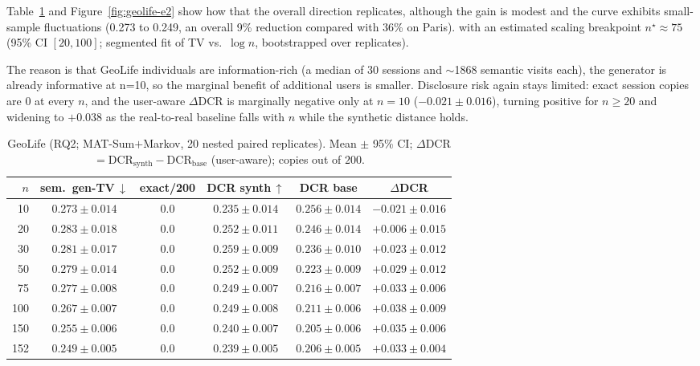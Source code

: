 \documentclass[sigconf,nonacm]{acmart}
\begin{document}
Table~\ref{tab:geolife-e2} and Figure~\ref{fig:geolife-e2} show  how that the overall direction replicates, although the gain is modest and the curve exhibits small-sample fluctuations (0.273 to 0.249, an overall 9\% reduction compared with 36\% on Paris).
 with an estimated scaling breakpoint $n^\star\!\approx\!75$ (95\% CI
$[20,100]$; segmented fit of TV vs.\ $\log n$, bootstrapped over replicates). 

The reason is that GeoLife
individuals are information-rich (a median of $30$ sessions and $\sim$1868 semantic visits each), the generator is already informative at n=10, so the marginal benefit of additional users is smaller. Disclosure risk again stays limited: exact session copies are $0$ at every $n$, and the user-aware $\Delta$DCR is marginally negative only at $n{=}10$
($-0.021\pm0.016$), turning positive for $n\ge20$ and widening to $+0.038$ as the real-to-real baseline
falls with $n$ while the synthetic distance holds.

\begin{table}[t]
  \caption{GeoLife (RQ2; MAT-Sum$+$Markov, 20 nested paired replicates). Mean $\pm$ 95\% CI;
  $\Delta$DCR $=\mathrm{DCR}_{\text{synth}}-\mathrm{DCR}_{\text{base}}$ (user-aware); copies out of $200$.}
  \label{tab:geolife-e2}
  \small
  \begin{tabular}{@{}rccccc@{}}
    \toprule
    $n$ & sem.\ gen-TV\,$\downarrow$ & exact/200 & DCR synth\,$\uparrow$ & DCR base & $\Delta$DCR \\
    \midrule
    10  & $0.273\pm0.014$ & $0.0$ & $0.235\pm0.014$ & $0.256\pm0.014$ & $-0.021\pm0.016$ \\
    20  & $0.283\pm0.018$ & $0.0$ & $0.252\pm0.011$ & $0.246\pm0.014$ & $+0.006\pm0.015$ \\
    30  & $0.281\pm0.017$ & $0.0$ & $0.259\pm0.009$ & $0.236\pm0.010$ & $+0.023\pm0.012$ \\
    50  & $0.279\pm0.014$ & $0.0$ & $0.252\pm0.009$ & $0.223\pm0.009$ & $+0.029\pm0.012$ \\
    75  & $0.277\pm0.008$ & $0.0$ & $0.249\pm0.007$ & $0.216\pm0.007$ & $+0.033\pm0.006$ \\
    100 & $0.267\pm0.007$ & $0.0$ & $0.249\pm0.008$ & $0.211\pm0.006$ & $+0.038\pm0.009$ \\
    150 & $0.255\pm0.006$ & $0.0$ & $0.240\pm0.007$ & $0.205\pm0.006$ & $+0.035\pm0.006$ \\
    152 & $0.249\pm0.005$ & $0.0$ & $0.239\pm0.005$ & $0.206\pm0.005$ & $+0.033\pm0.004$ \\
    \bottomrule
  \end{tabular}
\end{table}
\end{document}
